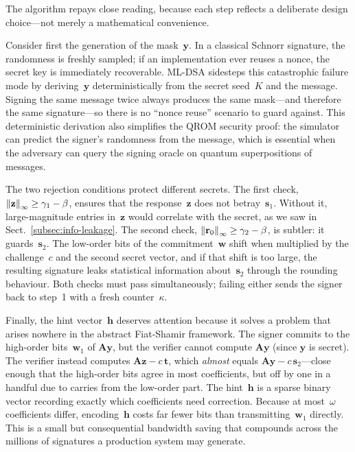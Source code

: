 The algorithm repays close reading, because each step reflects a deliberate design choice---not merely a mathematical convenience.

Consider first the generation of the mask~$\mathbf{y}$.  In a classical Schnorr signature, the randomness is freshly sampled; if an implementation ever reuses a nonce, the secret key is immediately recoverable.  ML-DSA sidesteps this catastrophic failure mode by deriving~$\mathbf{y}$ deterministically from the secret seed~$K$ and the message.  Signing the same message twice always produces the same mask---and therefore the same signature---so there is no ``nonce reuse'' scenario to guard against.  This deterministic derivation also simplifies the QROM security proof: the simulator can predict the signer's randomness from the message, which is essential when the adversary can query the signing oracle on quantum superpositions of messages.

The two rejection conditions protect different secrets.  The first check, $\left\lVert \mathbf{z} \right\rVert_\infty \geq \gamma_1 - \beta$, ensures that the response~$\mathbf{z}$ does not betray~$\mathbf{s}_1$.  Without it, large-magnitude entries in~$\mathbf{z}$ would correlate with the secret, as we saw in Sect.~\ref{subsec:info-leakage}.  The second check, $\left\lVert \mathbf{r}_0 \right\rVert_\infty \geq \gamma_2 - \beta$, is subtler: it guards~$\mathbf{s}_2$.  The low-order bits of the commitment~$\mathbf{w}$ shift when multiplied by the challenge~$c$ and the second secret vector, and if that shift is too large, the resulting signature leaks statistical information about~$\mathbf{s}_2$ through the rounding behaviour.  Both checks must pass simultaneously; failing either sends the signer back to step~1 with a fresh counter~$\kappa$.

Finally, the hint vector~$\mathbf{h}$ deserves attention because it solves a problem that arises nowhere in the abstract Fiat-Shamir framework.  The signer commits to the high-order bits~$\mathbf{w}_1$ of $\mathbf{A}\mathbf{y}$, but the verifier cannot compute $\mathbf{A}\mathbf{y}$ (since $\mathbf{y}$ is secret).  The verifier instead computes $\mathbf{A}\mathbf{z} - c\,\mathbf{t}$, which \emph{almost} equals $\mathbf{A}\mathbf{y} - c\,\mathbf{s}_2$---close enough that the high-order bits agree in most coefficients, but off by one in a handful due to carries from the low-order part.  The hint~$\mathbf{h}$ is a sparse binary vector recording exactly which coefficients need correction.  Because at most~$\omega$ coefficients differ, encoding~$\mathbf{h}$ costs far fewer bits than transmitting~$\mathbf{w}_1$ directly.  This is a small but consequential bandwidth saving that compounds across the millions of signatures a production system may generate.


